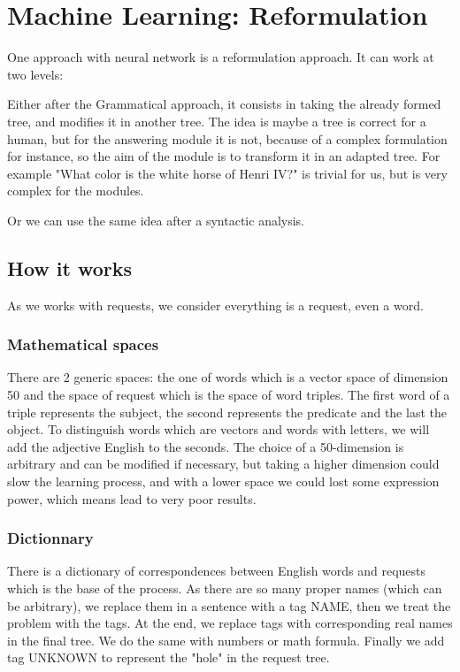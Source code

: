 \section{Machine Learning: Reformulation}

One approach with neural network is a reformulation approach. It can work at two levels: 

Either after the Grammatical approach, it consists in taking the already formed tree, and modifies it in another tree. The idea is maybe a tree is correct for a human, but for the answering module it is not, because of a complex formulation for instance, so the aim of the module is to transform it in an adapted tree. For example "What color is the white horse of Henri IV?" is trivial for us, but is very complex for the modules.

Or we can use the same idea after a syntactic analysis.

\subsection{How it works}

As we works with requests, we consider everything is a request, even a word.

\subsubsection{Mathematical spaces}

There are 2 generic spaces: the one of words which is a vector space of dimension 50 and the space of request which is the space of word triples. The first word of a triple represents the subject, the second represents the predicate and the last the object.
To distinguish words which are vectors and words with letters, we will add the adjective English to the seconds.
The choice of a 50-dimension is arbitrary and can be modified if necessary, but taking a higher dimension could slow the learning process, and with a lower space we could lost some expression power, which means lead to very poor results.

\subsubsection{Dictionnary}

There is a dictionary of correspondences between English words and requests which is the base of the process. As there are so many proper names (which can be arbitrary), we replace them in a sentence with a tag NAME, then we treat the problem with the tags. At the end, we replace tags with corresponding real names in the final tree. We do the same with numbers or math formula. Finally we add tag UNKNOWN to represent the "hole" in the request tree.

